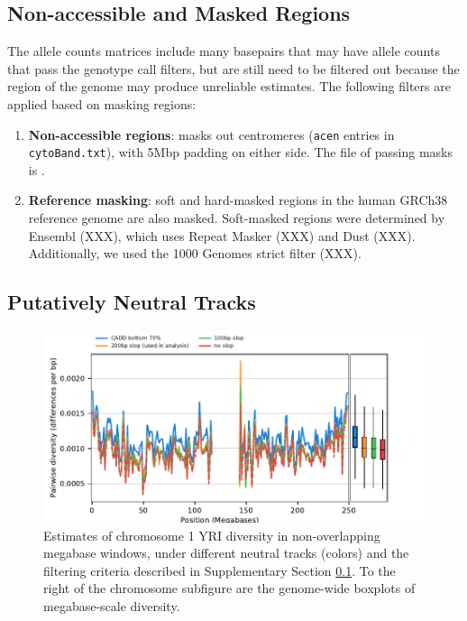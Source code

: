 \documentclass[11pt]{article}
\begin{document}
\subsection{Non-accessible and Masked Regions}
\label{supp:accessible}

The allele counts matrices include many basepairs that may have allele counts
that pass the genotype call filters, but are still need to be filtered out
because the region of the genome may produce unreliable estimates. The
following filters are applied based on masking regions:

\begin{enumerate}

  \item \textbf{Non-accessible regions}: masks out centromeres (\texttt{acen} entries in
    \texttt{cytoBand.txt}), with 5Mbp padding on either side. The file of
    passing masks is . 

  \item \textbf{Reference masking}: soft and hard-masked regions in the human
      GRCh38 reference genome are also masked. Soft-masked regions were
      determined by Ensembl (XXX), which uses Repeat Masker (XXX) and Dust
      (XXX). Additionally, we used the 1000 Genomes strict filter (XXX).

\end{enumerate}

\subsection{Putatively Neutral Tracks}

\begin{figure}[!htb]
  \centering
  \includegraphics[width=\textwidth]{figures/supplementary/neutral_tracks.pdf}

  \caption{Estimates of chromosome 1 YRI diversity in non-overlapping megabase
      windows, under different neutral tracks (colors) and the filtering
      criteria described in Supplementary Section \ref{supp:accessible}. To the
      right of the chromosome subfigure are the genome-wide boxplots of
      megabase-scale diversity. } 

  \label{suppfig:neutral-tracks}
\end{figure}
\end{document}
